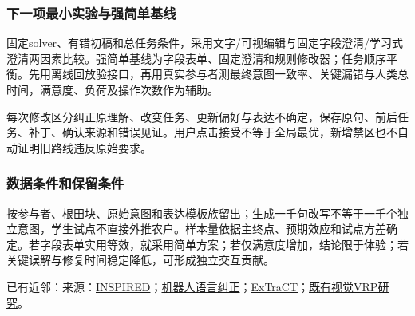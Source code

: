\documentclass[11pt,a4paper]{article}
\newcommand{\bodytext}[1]{#1\par}
\newcommand{\sourcetext}[1]{{\fontsize{9.2}{14}\selectfont\color{Muted}#1\par}}
\begin{document}
\subsubsection{下一项最小实验与强简单基线}
\bodytext{固定solver、有错初稿和总任务条件，采用文字/\allowbreak{}可视编辑与固定字段澄清/\allowbreak{}学习式澄清两因素比较。强简单基线为字段表单、固定澄清和规则修改器；任务顺序平衡。先用离线回放验接口，再用真实参与者测最终意图一致率、关键漏错与人类总时间，满意度、负荷及操作次数作为辅助。}
\bodytext{每次修改区分纠正原理解、改变任务、更新偏好与表达不确定，保存原句、前后任务、补丁、确认来源和错误见证。用户点击接受不等于全局最优，新增禁区也不自动证明旧路线违反原始要求。}
\subsubsection{数据条件和保留条件}
\bodytext{按参与者、根田块、原始意图和表达模板族留出；生成一千句改写不等于一千个独立意图，学生试点不直接外推农户。样本量依据主终点、预期效应和试点方差确定。若字段表单实用等效，就采用简单方案；若仅满意度增加，结论限于体验；若关键误解与修复时间稳定降低，可形成独立交互贡献。}
\sourcetext{已有近邻：来源：\href{https://aclanthology.org/2022.findings-acl.28/}{INSPIRED}；\href{https://arxiv.org/abs/2204.05186}{机器人语言纠正}；\href{https://arxiv.org/abs/2401.03701}{ExTraCT}；\href{https://drive.google.com/file/d/1dsLI6ydfXI\_AL8505bH9x8bBM\_JP9zaM/view}{既有视觉VRP研究}。}
\clearpage
\hypertarget{part_6}{}
\end{document}
